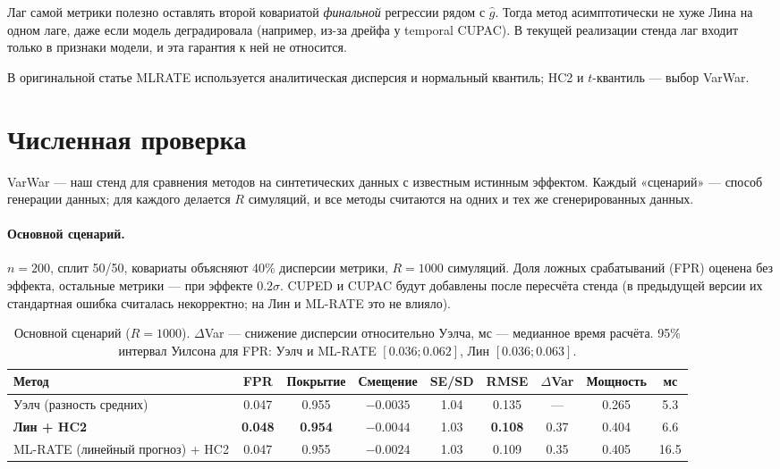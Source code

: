 \documentclass[10pt,a4paper]{article}
\begin{document}
Лаг самой метрики полезно оставлять второй ковариатой \emph{финальной} регрессии рядом с $\hat g$. Тогда
метод асимптотически не хуже Лина на одном лаге, даже если модель деградировала (например, из-за дрейфа
у temporal CUPAC). В текущей реализации стенда лаг входит только в признаки модели, и эта гарантия к ней
не относится.

В оригинальной статье MLRATE используется аналитическая дисперсия и нормальный квантиль; HC2 и
$t$-квантиль --- выбор VarWar.

\section{Численная проверка}\label{sec:numeric}

VarWar --- наш стенд для сравнения методов на синтетических данных с известным истинным эффектом.
Каждый «сценарий» --- способ генерации данных; для каждого делается $R$ симуляций, и все методы
считаются на одних и тех же сгенерированных данных.

\paragraph{Основной сценарий.} $n=200$, сплит 50/50, ковариаты объясняют 40\% дисперсии метрики,
$R=1000$ симуляций. Доля ложных срабатываний (FPR) оценена без эффекта, остальные метрики --- при эффекте
$0.2\sigma$. CUPED и CUPAC будут добавлены после пересчёта стенда (в предыдущей версии их стандартная
ошибка считалась некорректно; на Лин и ML-RATE это не влияло).

\begin{table}[H]
\centering\footnotesize\setlength{\tabcolsep}{3.2pt}
\caption{Основной сценарий ($R=1000$). $\Delta$Var --- снижение дисперсии относительно Уэлча, мс --- медианное время расчёта. 95\% интервал Уилсона для FPR: Уэлч и ML-RATE $[0.036;0.062]$, Лин $[0.036;0.063]$.}\label{tab:confirm}
\begin{tabular}{@{}lcccccccc@{}}
\toprule
Метод & FPR & Покрытие & Смещение & SE/SD & RMSE & $\Delta$Var & Мощность & мс \\
\midrule
Уэлч (разность средних) & 0.047 & 0.955 & $-0.0035$ & 1.04 & 0.135 & --- & 0.265 & 5.3 \\
\textbf{Лин + HC2} & \textbf{0.048} & \textbf{0.954} & $-0.0044$ & 1.03 & \textbf{0.108} & 0.37 & 0.404 & 6.6 \\
ML-RATE (линейный прогноз) + HC2 & 0.047 & 0.955 & $-0.0024$ & 1.03 & 0.109 & 0.35 & 0.405 & 16.5 \\
\bottomrule
\end{tabular}
\end{table}
\end{document}
